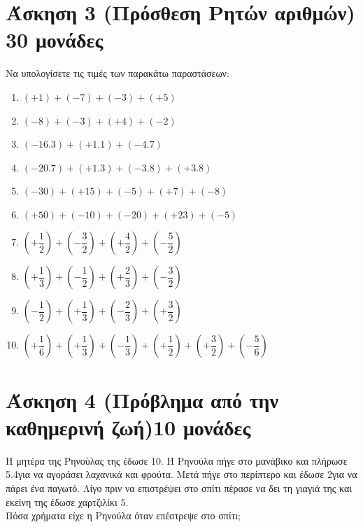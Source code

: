 \documentclass[a4paper,10pt]{report}
\begin{document}
\section*{Άσκηση 3 (Πρόσθεση Ρητών αριθμών) \hfill \small{30 μονάδες}}
Να υπολογίσετε τις τιμές των παρακάτω παραστάσεων:
\begin{enumerate}[1)]
 \item $(+1)+(-7)+(-3)+(+5)$
 \item $(-8)+(-3)+(+4)+(-2)$
 \item $(-16.3)+(+1.1)+(-4.7)$
 \item $(-20.7)+(+1.3)+(-3.8)+(+3.8)$
 \item $(-30)+(+15)+(-5)+(+7)+(-8)$
 \item $(+50)+(-10)+(-20)+(+23)+(-5)$
 \item $(+\dfrac{1}{2})+(-\dfrac{3}{2})+(+\dfrac{4}{2})+(-\dfrac{5}{2})$
 \item $(+\dfrac{1}{3})+(-\dfrac{1}{2})+(+\dfrac{2}{3})+(-\dfrac{3}{2})$
 \item $(-\dfrac{1}{2})+(+\dfrac{1}{3})+(-\dfrac{2}{3})+(+\dfrac{3}{2})$
 \item  $(+\dfrac{1}{6})+(+\dfrac{1}{3})+(-\dfrac{1}{3})+(+\dfrac{1}{2})+(+\dfrac{3}{2})+(-\dfrac{5}{6})$
\end{enumerate}



\section*{Άσκηση 4 (Πρόβλημα από την καθημερινή ζωή)\hfill \small{10 μονάδες}}
Η μητέρα της Ρηνούλας της έδωσε 10\texteuro. Η Ρηνούλα πήγε στο μανάβικο και πλήρωσε 5.4\texteuro \quad για να αγοράσει 
λαχανικά και φρούτα. Μετά πήγε στο περίπτερο και έδωσε 2\texteuro \quad για να πάρει ένα παγωτό. 
Λίγο πριν να επιστρέψει στο σπίτι πέρασε να δει τη γιαγιά της και εκείνη της έδωσε χαρτζιλίκι 5\texteuro.\\
 Πόσα χρήματα είχε η Ρηνούλα όταν επέστρεψε στο σπίτι;
\end{document}
